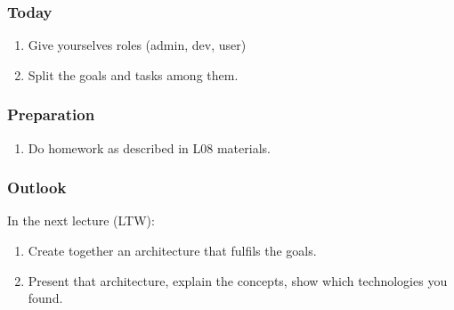 \begin{frame}
	\frametitle{Today}

	\begin{enumerate}
	\item Give yourselves roles (admin, dev, user)
	\item Split the goals and tasks among them.
	\end{enumerate}
\end{frame}

\begin{frame}
	\frametitle{Preparation}

	\begin{enumerate}
	\item Do homework as described in L08 materials.
	\end{enumerate}
\end{frame}

\begin{frame}
	\frametitle{Outlook}

	In the next lecture (LTW):

	\begin{enumerate}
	\item Create together an architecture that fulfils the goals.
	\item Present that architecture, explain the concepts, show which technologies you found.
	\end{enumerate}
\end{frame}



\appendix

\begin{frame}[allowframebreaks]
	
	
\end{frame}




